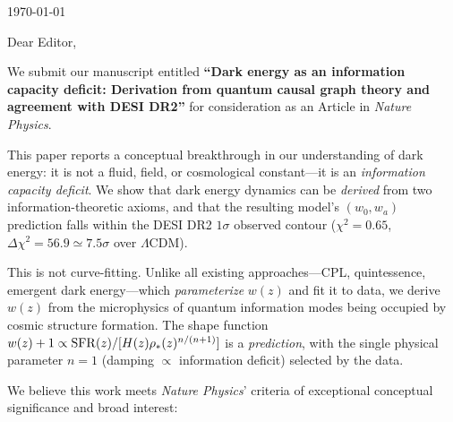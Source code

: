 \documentclass[12pt]{article}
\begin{document}
\begin{flushright}
\today
\end{flushright}

\vspace{10pt}

\noindent Dear Editor,

\vspace{10pt}

\noindent We submit our manuscript entitled {\bf ``Dark energy as an information capacity deficit: Derivation from quantum causal graph theory and agreement with DESI DR2''} for consideration as an Article in {\it Nature Physics}.

\vspace{10pt}


This paper reports a conceptual breakthrough in our understanding of dark energy: it is not a fluid, field, or cosmological constant---it is an {\it information capacity deficit}. We show that dark energy dynamics can be {\it derived} from two information-theoretic axioms, and that the resulting model's $(w_0,w_a)$ prediction falls within the DESI DR2 $1\sigma$ observed contour ($\chi^2=0.65$, $\Delta\chi^2=56.9\simeq7.5\sigma$ over $\Lambda$CDM).

This is not curve-fitting. Unlike all existing approaches---CPL, quintessence, emergent dark energy---which {\it parameterize} $w(z)$ and fit it to data, we derive $w(z)$ from the microphysics of quantum information modes being occupied by cosmic structure formation. The shape function $w(z)+1\propto{\rm SFR}(z)/[H(z)\rho_*(z)^{n/(n+1)}]$ is a {\it prediction}, with the single physical parameter $n=1$ (damping $\propto$ information deficit) selected by the data.

We believe this work meets {\it Nature Physics}' criteria of exceptional conceptual significance and broad interest:
\end{document}
